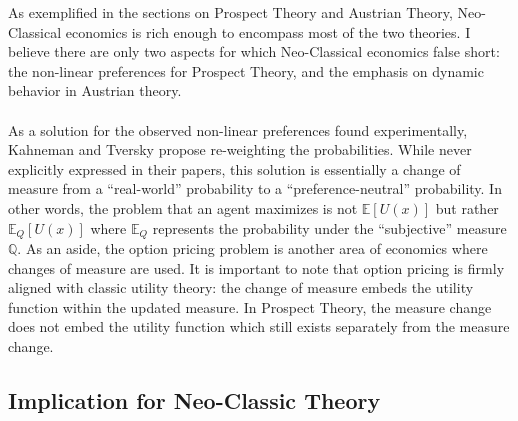 \documentclass{article}
\theoremstyle{definition}
\begin{document}
As exemplified in the sections on Prospect Theory and Austrian Theory, Neo-Classical economics is rich enough to encompass most of the two theories.  I believe there are only two aspects for which Neo-Classical economics false short: the non-linear preferences for Prospect Theory, and the emphasis on dynamic behavior in Austrian theory.  
\\
\\
As a solution for the observed non-linear preferences found experimentally, Kahneman and Tversky propose re-weighting the probabilities.  While never explicitly expressed in their papers, this solution is essentially a change of measure from a ``real-world'' probability to a ``preference-neutral'' probability.  In other words, the problem that an agent maximizes is not \(\mathbb{E}\left[U(x)\right]\) but rather \(\mathbb{E}_Q\left[U(x)\right]\) where \(\mathbb{E}_Q\) represents the probability under the ``subjective'' measure \(\mathbb{Q}\).  As an aside, the option pricing problem is another area of economics where changes of measure are used.  It is important to note that option pricing is firmly aligned with classic utility theory: the change of measure embeds the utility function within the updated measure.  In Prospect Theory, the measure change does not embed the utility function which still exists separately from the measure change.  

\subsection{Implication for Neo-Classic Theory}
\end{document}

